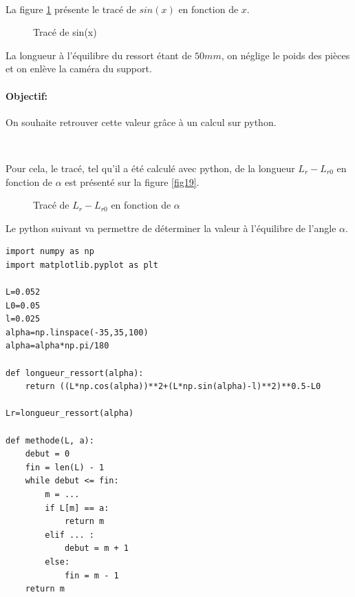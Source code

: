 

~\

La figure \ref{fig07} présente le tracé de $sin(x)$ en fonction de $x$.

\begin{figure}[ht!]
\begin{center}
  \resizebox{0.5\textwidth}{!}{}
\end{center}
\caption{Tracé de sin(x)}
\label{fig07}
\end{figure}

La longueur à l'équilibre du ressort étant de $50mm$, on néglige le poids des pièces et on enlève la caméra du support.


\paragraph{Objectif:} On souhaite retrouver cette valeur grâce à un calcul sur python.

~\

Pour cela, le tracé, tel qu'il a été calculé avec python, de la longueur $L_r-L_{r0}$ en fonction de $\alpha$ est présenté sur la figure \ref{fig19}.

\begin{figure}[ht!]
\begin{center}
  \resizebox{0.4\textwidth}{!}{}
\end{center}
\caption{Tracé de $L_r-L_{r0}$ en fonction de $\alpha$}
\label{figq19}
\end{figure}

\newpage

Le python suivant va permettre de déterminer la valeur à l'équilibre de l'angle $\alpha$.

\begin{verbatim}
import numpy as np
import matplotlib.pyplot as plt

L=0.052
L0=0.05
l=0.025
alpha=np.linspace(-35,35,100)
alpha=alpha*np.pi/180

def longueur_ressort(alpha):
    return ((L*np.cos(alpha))**2+(L*np.sin(alpha)-l)**2)**0.5-L0

Lr=longueur_ressort(alpha)

def methode(L, a):
    debut = 0
    fin = len(L) - 1
    while debut <= fin:
        m = ...
        if L[m] == a:
            return m
        elif ... :
            debut = m + 1
        else:
            fin = m - 1
    return m
\end{verbatim}

